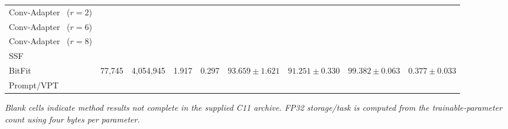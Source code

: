 \documentclass[pdflatex,sn-mathphys-num]{sn-jnl}
\theoremstyle{thmstyleone}
\theoremstyle{thmstyletwo}
\theoremstyle{thmstylethree}
\begin{document}
\begin{table}[!htbp]
{\begin{tabular}{@{}lrrrrrrrr@{}}
Conv-Adapter~\cite{chen2024convadapter} ($r=2$) &  &  &  &  &  &  &  & \\
Conv-Adapter~\cite{chen2024convadapter} ($r=6$) &  &  &  &  &  &  &  & \\
Conv-Adapter~\cite{chen2024convadapter} ($r=8$) &  &  &  &  &  &  &  & \\
SSF~\cite{lian2022ssf} &  &  &  &  &  &  &  & \\
BitFit~\cite{zaken2022bitfit} & 77,745 & 4,054,945 & 1.917 & 0.297 & $93.659\pm1.621$ & $91.251\pm0.330$ & $99.382\pm0.063$ & $0.377\pm0.033$ \\
Prompt/VPT~\cite{jia2022vpt} &  &  &  &  &  &  &  & \\
\bottomrule
\end{tabular}%
}
\vspace{2pt}
{\footnotesize\textit{Blank cells indicate method results not complete in the supplied C11 archive. FP32 storage/task is computed from the trainable-parameter count using four bytes per parameter.}}
\end{table}
\end{document}
